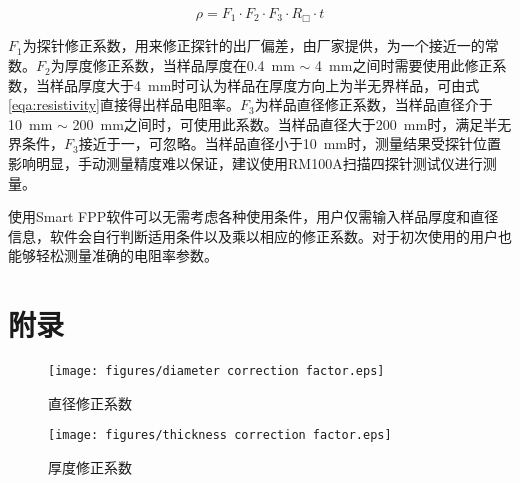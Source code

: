 \documentclass[12pt]{ctexart}
\begin{document}
\[\rho={F_1\cdot F_2\cdot F_3\cdot R_{\Box}\cdot t}\]\label{eqa:resistivity correction}

$F_1$为探针修正系数，用来修正探针的出厂偏差，由厂家提供，为一个接近一的常数。$F_2$为厚度修正系数，当样品厚度在0.4\ mm $\sim$ 4\ mm之间时需要使用此修正系数，当样品厚度大于4\ mm时可认为样品在厚度方向上为半无界样品，可由式\ref{eqa:resistivity}直接得出样品电阻率。$F_3$为样品直径修正系数，当样品直径介于10\ mm $\sim$ 200\ mm之间时，可使用此系数。当样品直径大于200\ mm时，满足半无界条件，$F_3$接近于一，可忽略。当样品直径小于10\ mm时，测量结果受探针位置影响明显，手动测量精度难以保证，建议使用RM100A扫描四探针测试仪进行测量。
\par 使用{\color{red}Smart FPP}软件可以无需考虑各种使用条件，用户仅需输入样品厚度和直径信息，软件会自行判断适用条件以及乘以相应的修正系数。对于初次使用的用户也能够轻松测量准确的电阻率参数。
\newpage
\section*{附录}

\begin{figure}[H]
	\centering
	\texttt{[image: figures/diameter correction factor.eps]}
	\caption{直径修正系数\label{figure:diameter correction factor}}
\end{figure}

\begin{figure}[H]
	\centering
	\texttt{[image: figures/thickness correction factor.eps]}
	\caption{厚度修正系数\label{figure:thickness correction factor}}
\end{figure}

\newpage
\end{document}
